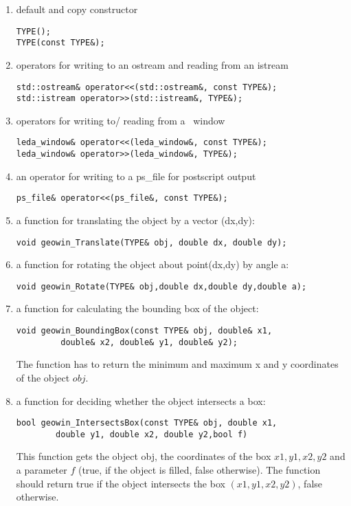 \begin{enumerate}
\item default and copy constructor
\begin{verbatim}
TYPE();
TYPE(const TYPE&);
\end{verbatim}
\item operators for writing to an ostream and reading from an istream
\begin{verbatim}
std::ostream& operator<<(std::ostream&, const TYPE&);
std::istream operator>>(std::istream&, TYPE&);
\end{verbatim}
\item operators for writing to/ reading from a \leda\ window
\begin{verbatim}
leda_window& operator<<(leda_window&, const TYPE&);
leda_window& operator>>(leda_window&, TYPE&);
\end{verbatim}
\item an operator for writing to a ps\_file for postscript output
\begin{verbatim}
ps_file& operator<<(ps_file&, const TYPE&);
\end{verbatim}
\item a function for translating the object by a vector (dx,dy):
\begin{verbatim}
void geowin_Translate(TYPE& obj, double dx, double dy);
\end{verbatim}
\item a function for rotating the object  about point(dx,dy) by angle a:
\begin{verbatim}
void geowin_Rotate(TYPE& obj,double dx,double dy,double a);
\end{verbatim}
\item a function for calculating the bounding box of the object:
\begin{verbatim}
void geowin_BoundingBox(const TYPE& obj, double& x1, 
         double& x2, double& y1, double& y2);
\end{verbatim}
The function has to return the minimum and maximum x and y coordinates of the object $obj$.
\item a function for deciding whether the object intersects a box:
\begin{verbatim}
bool geowin_IntersectsBox(const TYPE& obj, double x1,
        double y1, double x2, double y2,bool f)
\end{verbatim}
This function gets the object obj, the coordinates of the box $x1,y1,x2,y2$ and a parameter $f$
(true, if the object is filled, false otherwise). The function should return true if
the object intersects the box $(x1, y1, x2, y2)$, false otherwise.


\end{enumerate}
